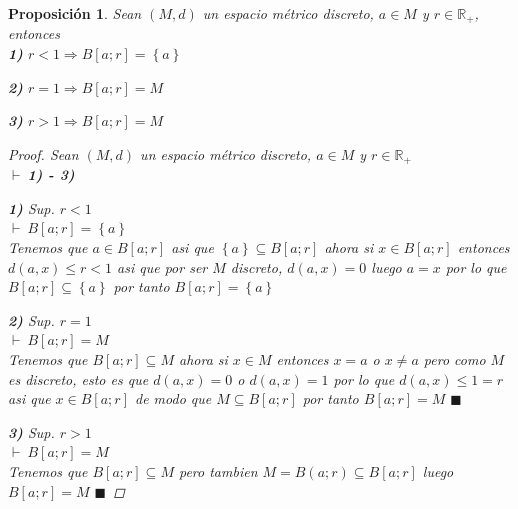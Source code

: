 \documentclass[oneside]{book} %
\theoremstyle{Teorema}
\newtheorem{Proposicion}[Definicion]{Proposición}
\theoremstyle{Ejemplos}
\theoremstyle{[Obs]}
\renewcommand{\{}{\left\lbrace} %
\renewcommand{\}}{\right\rbrace} %
\renewcommand{\sc}{\subseteq} %
\newcommand{\R}{\mathbb{R}} %
\renewcommand{\qed}{$\blacksquare$} %
\newcommand{\pd}{$\vdash\ $} %
\begin{document}
			\begin{Proposicion}\setlength{\parindent}{0em}
			
				Sean $(M, d)$ un espacio métrico discreto, $a \in M$ y $r \in \R_{+}$, entonces \\ 

				\textbf{1)} $r < 1 \Rightarrow B[a;r] = \{ a \}$

				\textbf{2)} $r = 1 \Rightarrow B[a;r] = M$

				\textbf{3)} $r > 1 \Rightarrow B[a;r] = M$ 

				\begin{proof}
					
					Sean $(M, d)$ un espacio métrico discreto, $a \in M$ y $r \in \R_{+}$ \\
					\pd \textbf{1) - 3)}

					\textbf{1)} Sup. $r < 1$ \\ 
					\pd $B[a;r] = \{ a \}$ \\ 
					Tenemos que $a \in B[a;r]$ asi que $\{ a \} \sc B[a;r]$ ahora si $x \in B[a;r]$ entonces $d(a, x) \leq r < 1$ asi que por ser $M$ discreto, $d(a, x) = 0$ luego $a = x$ por lo que $B[a;r] \sc \{ a \}$ por tanto $B[a;r] = \{ a \}$

					\textbf{2)} Sup. $r = 1$ \\ 
					\pd $B[a;r] = M$ \\ 
					Tenemos que $B[a;r] \sc M$ ahora si $x \in M$ entonces $x = a$ o $x \neq a$ pero como $M$ es discreto, esto es que $d(a, x) = 0$ o $d(a, x) = 1$ por lo que $d(a, x) \leq 1 = r$ asi que $x \in B[a;r]$ de modo que $M \sc B[a;r]$ por tanto $B[a;r] = M$ \qed

					\textbf{3)} Sup. $r > 1$ \\ 
					\pd $B[a;r] = M$ \\ 
					Tenemos que $B[a;r] \sc M$ pero tambien $M = B(a;r) \sc B[a;r]$ luego $B[a;r] = M$ \qed

				\end{proof}
			
			\end{Proposicion}
\end{document}
